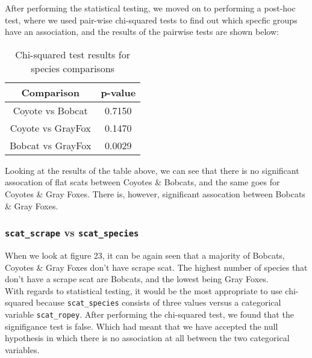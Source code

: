 \documentclass[a4paper]{article}
\begin{document}
\noindent After performing the statistical testing, we moved on to performing a post-hoc test, where we used pair-wise chi-squared tests to find out which
specfic groups have an association, and the results of the pairwise tests are shown below:

\begin{table}[h]
    \centering
    \begin{tabular}{|c|c|}
        \hline
        Comparison & p-value \\
        \hline
        Coyote vs Bobcat & 0.7150 \\
        Coyote vs GrayFox & 0.1470 \\
        Bobcat vs GrayFox & 0.0029 \\
        \hline
    \end{tabular}
    \caption{Chi-squared test results for species comparisons}
    \label{tab:chi_squared_results_flat}
\end{table}

\noindent Looking at the results of the table above, we can see that there is no significant assocation of flat scats between Coyotes \& Bobcats, and the same
goes for Coyotes \& Gray Foxes. There is, however, significant assocation between Bobcats \& Gray Foxes. 

\subsubsection{\texttt{scat\_scrape} vs \texttt{scat\_species}}
When we look at figure 23, it can be again seen that a majority of Bobcats, Coyotes \& Gray Foxes don't have scrape scat. The highest number of species that
don't have a scrape scat are Bobcats, and the lowest being Gray Foxes. \\

\noindent With regards to statistical testing, it would be the most appropriate to use chi-squared because \texttt{scat\_species} consists of three values
versus a categorical variable \texttt{scat\_ropey}. After performing the chi-squared test, we found that the signifigance test is false. Which had meant that
we have accepted the null hypothesis in which there is no association at all between the two categorical variables. \\

\newpage
\end{document}
